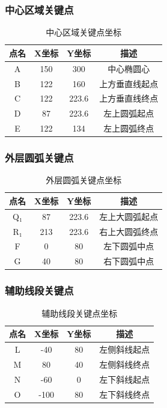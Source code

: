 \documentclass[12pt,a4paper]{article}
\begin{document}
\subsubsection{中心区域关键点}

\begin{table}[H]
\centering
\caption{中心区域关键点坐标}
\begin{tabular}{|c|c|c|c|}
\hline
\textbf{点名} & \textbf{X坐标} & \textbf{Y坐标} & \textbf{描述} \\
\hline
A & 150 & 300 & 中心椭圆心 \\
\hline
B & 122 & 160 & 上方垂直线起点 \\
\hline
C & 122 & 223.6 & 上方垂直线终点 \\
\hline
D & 87 & 223.6 & 左上圆弧起点 \\
\hline
E & 122 & 134 & 左上圆弧终点 \\
\hline
\end{tabular}
\end{table}

\subsubsection{外层圆弧关键点}

\begin{table}[H]
\centering
\caption{外层圆弧关键点坐标}
\begin{tabular}{|c|c|c|c|}
\hline
\textbf{点名} & \textbf{X坐标} & \textbf{Y坐标} & \textbf{描述} \\
\hline
Q₁ & 87 & 223.6 & 左上大圆弧起点 \\
\hline
R₁ & 213 & 223.6 & 右上大圆弧终点 \\
\hline
F & 0 & 80 & 左下圆弧中点 \\
\hline
G & 40 & 80 & 右下圆弧中点 \\
\hline
\end{tabular}
\end{table}

\subsubsection{辅助线段关键点}

\begin{table}[H]
\centering
\caption{辅助线段关键点坐标}
\begin{tabular}{|c|c|c|c|}
\hline
\textbf{点名} & \textbf{X坐标} & \textbf{Y坐标} & \textbf{描述} \\
\hline
L & -40 & 80 & 左侧斜线起点 \\
\hline
M & 80 & 40 & 左侧斜线终点 \\
\hline
N & -60 & 0 & 左下斜线起点 \\
\hline
O & -100 & 80 & 左下斜线终点 \\
\hline
\end{tabular}
\end{table}
\end{document}
